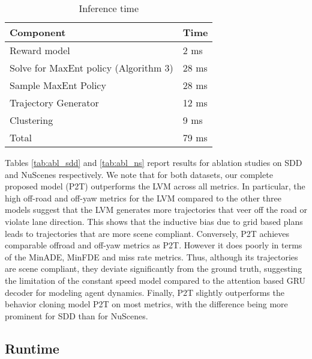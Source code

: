 \documentclass[journal]{IEEEtran}
\begin{document}
\begin{table}[]
\caption{Inference time}
\centering
\begin{tabularx}{0.8\columnwidth}{lY}
\toprule
Component                                                                       & Time \\ \midrule
Reward model                                                                    & 2 ms     \\
Solve for MaxEnt policy (Algorithm 3)                                            & 28 ms    \\
Sample MaxEnt Policy                                                            & 28 ms    \\
Trajectory Generator                                                            & 12 ms    \\
Clustering                                                                      & 9 ms     \\ \midrule
Total                                                                           & 79 ms    \\ \bottomrule
\end{tabularx}
\label{tab:time}
\end{table}

Tables \ref{tab:abl_sdd} and \ref{tab:abl_ns} report results for ablation studies on SDD and NuScenes respectively. We note that for both datasets, our complete proposed model (P2T) outperforms the LVM across all metrics. In particular, the high off-road and off-yaw metrics for the LVM compared to the other three models suggest that the LVM generates more trajectories that veer off the road or violate lane direction. This shows that the inductive bias due to grid based plans leads to trajectories that are more scene compliant. Conversely, P2T achieves comparable offroad and off-yaw metrics as P2T. However it does poorly in terms of the MinADE, MinFDE and miss rate metrics. Thus, although its trajectories are scene compliant, they deviate significantly from the ground truth, suggesting the limitation of the constant speed model compared to the attention based GRU decoder for modeling agent dynamics. Finally, P2T slightly outperforms the behavior cloning model P2T on most metrics, with the difference being more prominent for SDD than for NuScenes.


\subsection{Runtime}
\end{document}
